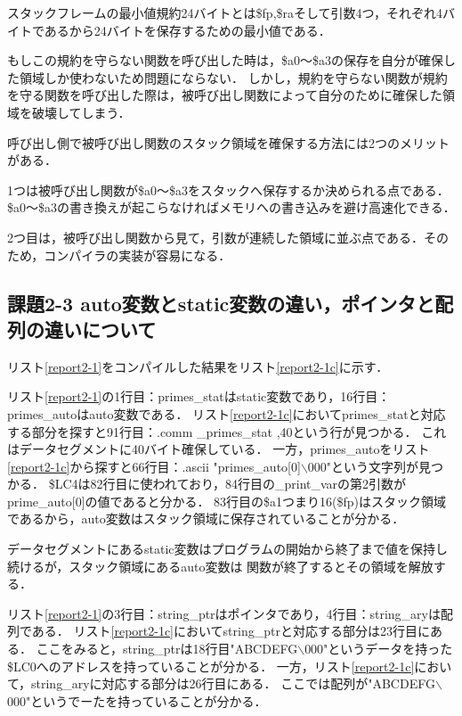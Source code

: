 \documentclass[11pt]{jarticle}
\begin{document}
スタックフレームの最小値規約24バイトとは\$fp,\$raそして引数4つ，それぞれ4バイトであるから24バイトを保存するための最小値である．

もしこの規約を守らない関数を呼び出した時は，\$a0～\$a3の保存を自分が確保した領域しか使わないため問題にならない．
しかし，規約を守らない関数が規約を守る関数を呼び出した際は，被呼び出し関数によって自分のために確保した領域を破壊してしまう．

呼び出し側で被呼び出し関数のスタック領域を確保する方法には2つのメリットがある．

1つは被呼び出し関数が\$a0～\$a3をスタックへ保存するか決められる点である．
\$a0～\$a3の書き換えが起こらなければメモリへの書き込みを避け高速化できる．

2つ目は，被呼び出し関数から見て，引数が連続した領域に並ぶ点である．そのため，コンパイラの実装が容易になる．

\subsection{課題2-3 auto変数とstatic変数の違い，ポインタと配列の違いについて}

リスト\ref{report2-1}をコンパイルした結果をリスト\ref{report2-1c}に示す．

リスト\ref{report2-1}の1行目：primes\_statはstatic変数であり，16行目：primes\_autoはauto変数である．
リスト\ref{report2-1c}においてprimes\_statと対応する部分を探すと91行目：.comm \_primes\_stat ,40という行が見つかる．
これはデータセグメントに40バイト確保している．
一方，primes\_autoをリスト\ref{report2-1c}から探すと66行目：.ascii "primes\_auto[0]$\backslash$000"という文字列が見つかる．
\$LC4は82行目に使われており，84行目の\_print\_varの第2引数がprime\_auto[0]の値であると分かる．
83行目の\$a1つまり16(\$fp)はスタック領域であるから，auto変数はスタック領域に保存されていることが分かる．

データセグメントにあるstatic変数はプログラムの開始から終了まで値を保持し続けるが，スタック領域にあるauto変数は
関数が終了するとその領域を解放する．

リスト\ref{report2-1}の3行目：string\_ptrはポインタであり，4行目：string\_aryは配列である．
リスト\ref{report2-1c}においてstring\_ptrと対応する部分は23行目にある．
ここをみると，string\_ptrは18行目"ABCDEFG$\backslash$000"というデータを持った\$LC0へのアドレスを持っていることが分かる．
一方，リスト\ref{report2-1c}において，string\_aryに対応する部分は26行目にある．
ここでは配列が"ABCDEFG$\backslash$000"というでーたを持っていることが分かる．
\end{document}
